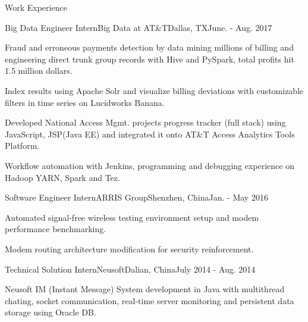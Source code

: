 \documentclass{resume} %
\begin{document}
\begin{rSection}{Work Experience}
\begin{rSubsection}{Big Data Engineer Intern}{Big Data at AT\&T}{Dallas, TX}{June. - Aug. 2017}
\item Fraud and erroneous payments detection by data mining millions of billing and engineering direct trunk group records with Hive and PySpark, total profits hit 1.5 million dollars.
\item Index results using Apache Solr and visualize billing deviations with customizable filters in time series on Lucidworks Banana.
\item Developed National Access Mgmt. projects progress tracker (full stack) using JavaScript, JSP(Java EE) and integrated it onto AT\&T Access Analytics Tools Platform.
\item Workflow automation with Jenkins, programming and debugging experience on Hadoop YARN, Spark and Tez.
\end{rSubsection}

\begin{rSubsection}{Software Engineer Intern}{ARRIS Group}{Shenzhen, China}{Jan. - May 2016}
\item Automated signal-free wireless testing environment setup and modem performance benchmarking.
\item Modem routing architecture modification for security reinforcement.
\end{rSubsection}

\begin{rSubsection}{Technical Solution Intern}{Neusoft}{Dalian, China}{July 2014 - Aug. 2014}
\item Neusoft IM (Instant Message) System development in Java with multithread chating, socket communication, real-time server monitoring and persistent data storage using Oracle DB.
\end{rSubsection}
\end{rSection}
\end{document}
